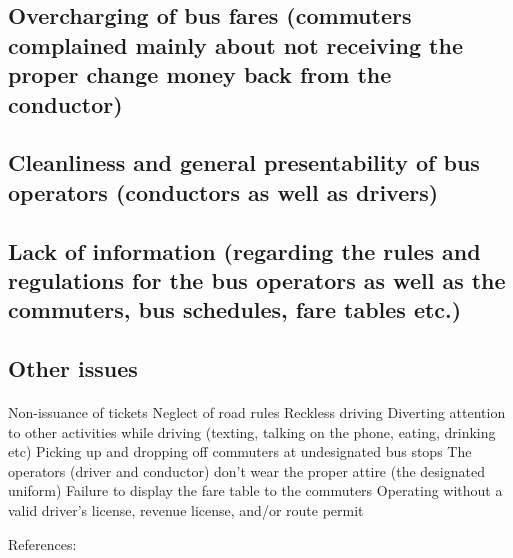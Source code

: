 \subsection{Overcharging of bus fares (commuters complained mainly about not receiving the proper change money back from the conductor)}

\paragraph{} 

\subsection{Cleanliness and general presentability of bus operators (conductors as well as drivers)}

\paragraph{} 

\subsection{Lack of information (regarding the rules and regulations for the bus operators as well as the commuters, bus schedules, fare tables etc.)}

\paragraph{} 

\subsection{Other issues}

\paragraph{} 

Non-issuance of tickets
Neglect of road rules
Reckless driving
Diverting attention to other activities while driving (texting, talking on the phone, eating, drinking etc)
Picking up and dropping off commuters at undesignated bus stops
The operators (driver and conductor) don't wear the proper attire (the designated uniform)
Failure to display the fare table to the commuters
Operating without a valid driver's license, revenue license, and/or route permit

References: \cite{Wickremasekara2012, Range2012}


